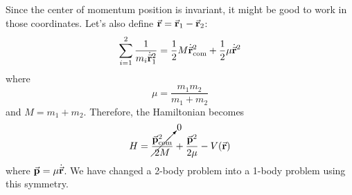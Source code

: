 \documentclass[a4paper,twoside,master.tex]{subfiles}
\begin{document}
Since the center of momentum position is invariant, it might be good to work in those coordinates. Let's also define $ \va{r} = \va{r}_1 - \va{r}_2 $:
\begin{equation}
    \sum_{i=1}^{2} \frac{1}{m_i \dot{\va{r}}_1^2} = \frac{1}{2} M \dot{\va{r}}_{\text{com}}^2 + \frac{1}{2} \mu \dot{\va{r}}^2
\end{equation}
where
\begin{equation}
    \mu = \frac{m_1 m_2}{m_1 + m_2} 
\end{equation}
and $ M = m_1 + m_2 $. Therefore, the Hamiltonian becomes
\begin{equation}
    H = \cancelto{0}{\frac{\va{p}^2_{\text{com}}}{2M}} + \frac{\va{p}^2}{2 \mu} - V(\va{r})
\end{equation}
where $ \va{p} = \mu \dot{\va{r}} $. We have changed a 2-body problem into a 1-body problem using this symmetry.
\end{document}
